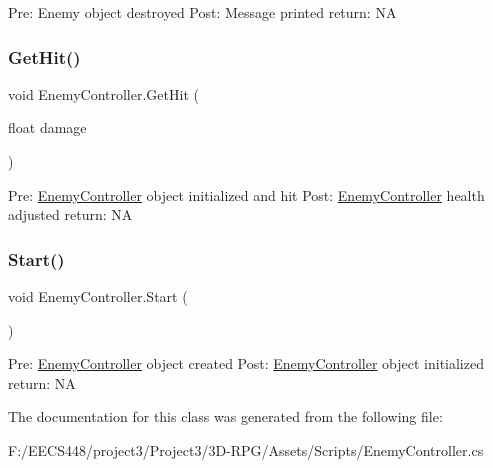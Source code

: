 Pre\+: Enemy object destroyed Post\+: Message printed return\+: NA \mbox{\label{class_enemy_controller_a1aefc89669c41a6353ecf463c937af07}} 
\subsubsection{\texorpdfstring{Get\+Hit()}{GetHit()}}
{\footnotesize\ttfamily void Enemy\+Controller.\+Get\+Hit (\begin{DoxyParamCaption}\item[{float}]{damage }\end{DoxyParamCaption})}

Pre\+: \hyperlink{class_enemy_controller}{Enemy\+Controller} object initialized and hit Post\+: \hyperlink{class_enemy_controller}{Enemy\+Controller} health adjusted return\+: NA \mbox{\label{class_enemy_controller_aef5af22782327b22749e5632ad7467fb}} 
\subsubsection{\texorpdfstring{Start()}{Start()}}
{\footnotesize\ttfamily void Enemy\+Controller.\+Start (\begin{DoxyParamCaption}{ }\end{DoxyParamCaption})\hspace{0.3cm}{\ttfamily [private]}}

Pre\+: \hyperlink{class_enemy_controller}{Enemy\+Controller} object created Post\+: \hyperlink{class_enemy_controller}{Enemy\+Controller} object initialized return\+: NA 

The documentation for this class was generated from the following file\+:\begin{DoxyCompactItemize}
\item 
F\+:/\+E\+E\+C\+S448/project3/\+Project3/3\+D-\/\+R\+P\+G/\+Assets/\+Scripts/Enemy\+Controller.\+cs\end{DoxyCompactItemize}
